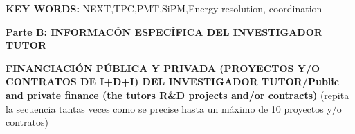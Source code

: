 \documentclass[a4paper,11pt,oneside]{article}
\begin{document}
\noindent\textbf{KEY WORDS:} NEXT,TPC,PMT,SiPM,Energy resolution,
coordination\\

\newpage
\setcounter{page}{1}

\begin{tcolorbox}[colback=yellow,arc=0pt,outer arc=0pt,colframe=black,boxrule=0.6pt,left=0mm]
  \textbf{Parte B: INFORMAC\'ON ESPEC\'IFICA DEL INVESTIGADOR TUTOR}
\end{tcolorbox}

\textbf{FINANCIACI\'ON P\'UBLICA Y PRIVADA (PROYECTOS Y/O CONTRATOS DE
  I+D+I) DEL INVESTIGADOR TUTOR/Public and private finance (the tutors
  R\&D projects
  and/or contracts)} (repita la secuencia tantas veces como se precise hasta un máximo de 10 proyectos y/o contratos)
\end{document}
